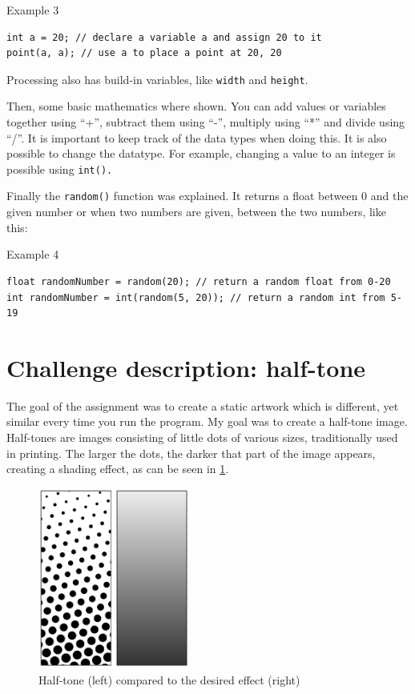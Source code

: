 \begin{codebox}{Example 3}
    \begin{lstlisting}
int a = 20; // declare a variable a and assign 20 to it
point(a, a); // use a to place a point at 20, 20
    \end{lstlisting}
\end{codebox}

Processing also has build-in variables, like \texttt{width} and \texttt{height}.

Then, some basic mathematics where shown. You can add values or variables together using ``+'', subtract them using ``-'', multiply using ``*'' and divide using ``/''. It is important to keep track of the data types when doing this. It is also possible to change the datatype. For example, changing a value to an integer is possible using \texttt{int().}

Finally the \texttt{random()} function was explained. It returns a float between 0 and the given number or when two numbers are given, between the two numbers, like this:

\begin{codebox}{Example 4}
    \begin{lstlisting}
float randomNumber = random(20); // return a random float from 0-20
int randomNumber = int(random(5, 20)); // return a random int from 5-19
    \end{lstlisting}
\end{codebox}

\section{Challenge description: half-tone}

The goal of the assignment was to create a static artwork which is different, yet similar every time you run the program. My goal was to create a half-tone image. Half-tones are images consisting of little dots of various sizes, traditionally used in printing. The larger the dots, the darker that part of the image appears, creating a shading effect, as can be seen in \cref{fig: half-tone}.

\begin{figure}[H]
    \centering
    \includegraphics[width = 5cm]{Figures/day_1/half_tone.png}
    \caption{Half-tone (left) compared to the desired effect (right)}
    \label{fig: half-tone}
\end{figure}

